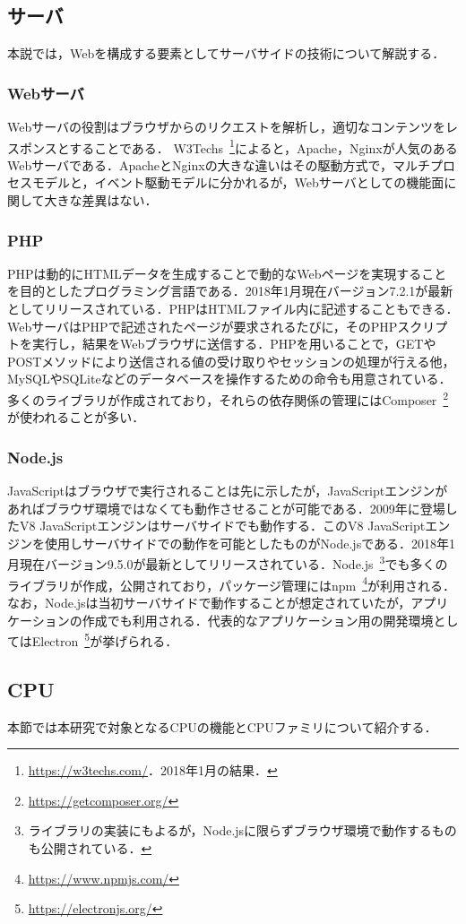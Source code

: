\subsection{サーバ}
本説では，Webを構成する要素としてサーバサイドの技術について解説する．
\subsubsection{Webサーバ}
Webサーバの役割はブラウザからのリクエストを解析し，適切なコンテンツをレスポンスとすることである．
W3Techs~\footnote{\url{https://w3techs.com/}．2018年1月の結果．}によると，Apache，Nginxが人気のあるWebサーバである．ApacheとNginxの大きな違いはその駆動方式で，マルチプロセスモデルと，イベント駆動モデルに分かれるが，Webサーバとしての機能面に関して大きな差異はない．
\subsubsection{PHP}
PHPは動的にHTMLデータを生成することで動的なWebページを実現することを目的としたプログラミング言語である．2018年1月現在バージョン7.2.1が最新としてリリースされている．PHPはHTMLファイル内に記述することもできる．WebサーバはPHPで記述されたページが要求されるたびに，そのPHPスクリプトを実行し，結果をWebブラウザに送信する．PHPを用いることで，GETやPOSTメソッドにより送信される値の受け取りやセッションの処理が行える他，MySQLやSQLiteなどのデータベースを操作するための命令も用意されている．多くのライブラリが作成されており，それらの依存関係の管理にはComposer~\footnote{\url{https://getcomposer.org/}}が使われることが多い．
\subsubsection{Node.js}
JavaScriptはブラウザで実行されることは先に示したが，JavaScriptエンジンがあればブラウザ環境ではなくても動作させることが可能である．2009年に登場したV8 JavaScriptエンジンはサーバサイドでも動作する．このV8 JavaScriptエンジンを使用しサーバサイドでの動作を可能としたものがNode.jsである．2018年1月現在バージョン9.5.0が最新としてリリースされている．Node.js~\footnote{ライブラリの実装にもよるが，Node.jsに限らずブラウザ環境で動作するものも公開されている．}でも多くのライブラリが作成，公開されており，パッケージ管理にはnpm~\footnote{\url{https://www.npmjs.com/}}が利用される．なお，Node.jsは当初サーバサイドで動作することが想定されていたが，アプリケーションの作成でも利用される．代表的なアプリケーション用の開発環境としてはElectron~\footnote{\url{https://electronjs.org/}}が挙げられる．
\subsection{CPU}
本節では本研究で対象となるCPUの機能とCPUファミリについて紹介する．
